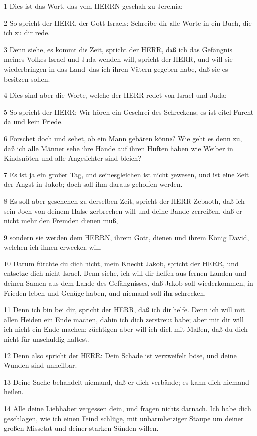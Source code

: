 \par 1 Dies ist das Wort, das vom HERRN geschah zu Jeremia:
\par 2 So spricht der HERR, der Gott Israels: Schreibe dir alle Worte in ein Buch, die ich zu dir rede.
\par 3 Denn siehe, es kommt die Zeit, spricht der HERR, daß ich das Gefängnis meines Volkes Israel und Juda wenden will, spricht der HERR, und will sie wiederbringen in das Land, das ich ihren Vätern gegeben habe, daß sie es besitzen sollen.
\par 4 Dies sind aber die Worte, welche der HERR redet von Israel und Juda:
\par 5 So spricht der HERR: Wir hören ein Geschrei des Schreckens; es ist eitel Furcht da und kein Friede.
\par 6 Forschet doch und sehet, ob ein Mann gebären könne? Wie geht es denn zu, daß ich alle Männer sehe ihre Hände auf ihren Hüften haben wie Weiber in Kindsnöten und alle Angesichter sind bleich?
\par 7 Es ist ja ein großer Tag, und seinesgleichen ist nicht gewesen, und ist eine Zeit der Angst in Jakob; doch soll ihm daraus geholfen werden.
\par 8 Es soll aber geschehen zu derselben Zeit, spricht der HERR Zebaoth, daß ich sein Joch von deinem Halse zerbrechen will und deine Bande zerreißen, daß er nicht mehr den Fremden dienen muß,
\par 9 sondern sie werden dem HERRN, ihrem Gott, dienen und ihrem König David, welchen ich ihnen erwecken will.
\par 10 Darum fürchte du dich nicht, mein Knecht Jakob, spricht der HERR, und entsetze dich nicht Israel. Denn siehe, ich will dir helfen aus fernen Landen und deinen Samen aus dem Lande des Gefängnisses, daß Jakob soll wiederkommen, in Frieden leben und Genüge haben, und niemand soll ihn schrecken.
\par 11 Denn ich bin bei dir, spricht der HERR, daß ich dir helfe. Denn ich will mit allen Heiden ein Ende machen, dahin ich dich zerstreut habe; aber mit dir will ich nicht ein Ende machen; züchtigen aber will ich dich mit Maßen, daß du dich nicht für unschuldig haltest.
\par 12 Denn also spricht der HERR: Dein Schade ist verzweifelt böse, und deine Wunden sind unheilbar.
\par 13 Deine Sache behandelt niemand, daß er dich verbände; es kann dich niemand heilen.
\par 14 Alle deine Liebhaber vergessen dein, und fragen nichts darnach. Ich habe dich geschlagen, wie ich einen Feind schlüge, mit unbarmherziger Staupe um deiner großen Missetat und deiner starken Sünden willen.
